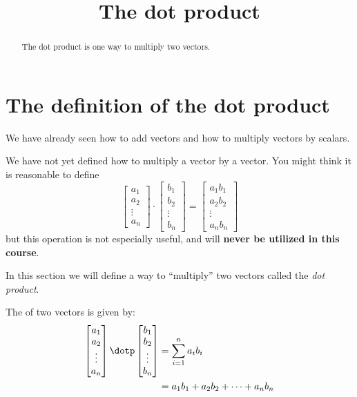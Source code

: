 \documentclass{ximera}
\title[Dig-In:]{The dot product}
\begin{document}
\begin{abstract}
  The dot product is one way to multiply two vectors.
\end{abstract}
\maketitle


\section{The definition of the dot product}

We have already seen how to add vectors and how to multiply vectors by
scalars.

\begin{warning}
We have not yet defined how to multiply a vector by a vector.  You
might think it is reasonable to define
\[
\begin{bmatrix}
  a_1\\
  a_2\\
  \vdots\\
  a_n
\end{bmatrix}
\cdot
\begin{bmatrix}
  b_1\\
  b_2\\
  \vdots\\
  b_n
\end{bmatrix}
=
\begin{bmatrix}
  a_1b_1\\
  a_2b_2\\
  \vdots\\
  a_nb_n
\end{bmatrix}
\] 
but this operation is not especially useful, and will \textbf{never be
  utilized in this course}.
\end{warning}

In this section we will define a way to ``multiply'' two vectors
called the \textit{dot product}.

\begin{definition}
  The  of two vectors is given by:
  \begin{align*}
  \begin{bmatrix}
    a_1\\
    a_2\\
    \vdots\\
    a_n
  \end{bmatrix}
  \dotp
  \begin{bmatrix}
    b_1\\
    b_2\\
    \vdots\\
    b_n
  \end{bmatrix}
  &= \sum_{i=1}^n a_ib_i\\
  &= a_1b_1 + a_2b_2 +\dots+a_nb_n
  \end{align*}
\end{definition}
\end{document}
